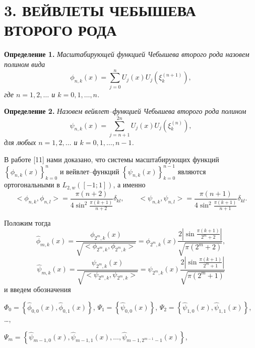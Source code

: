 \documentclass[12pt]{book}
\begin{document}
\section*{3. ВЕЙВЛЕТЫ ЧЕБЫШЕВА ВТОРОГО РОДА}

\noindent\textbf{Определение 1. }\textit{
Масштабирующей функцией Чебышева второго рода назовем полином вида
\begin{equation*}
\label{scaling}
\phi_{n,k}(x) = \sum\limits_{j=0}^{n}U_{j}(x)U_{j}(\xi_{k}^{(n+1)}),
\end{equation*}
где
$n=1,2,\ldots$ и $k=0,1,\ldots,n$.
}


\noindent\textbf{Определение 2. }\textit{
Назовем вейвлет--функцией Чебышева второго рода полином
\begin{equation*}
\label{sms1wavelet}
\psi_{n,k}(x) = \sum\limits_{j=n+1}^{2n}U_{j}(x)U_{j}(\xi_{k}^{(n)}),
\end{equation*}
для любых
$n=1,2,\ldots$ и $k=0,1,\ldots,n-1$.
}



В работе [11]
нами доказано, что системы масштабирующих функций  $\left\{ \phi_{n,k}(x)\right\}_{k=0}^{n}$ и
вейвлет--функций $\left\{ \psi_{n,k}(x)\right\}_{k=0}^{n-1}$ являются ортогональными в $L_{2, w}([-1; 1])$, а именно
\begin{equation*}
<\phi_{n,k}, \phi_{n,l}> =
\frac{\pi(n+2)}{4\sin^2{\frac{\pi(k+1)}{n+2}}} \delta_{kl}, \qquad <\psi_{n,k}, \psi_{n,l}> =
\frac{\pi(n+1)}{4\sin^2{\frac{\pi(k+1)}{n+1}}} \delta_{kl}.
\end{equation*}


Положим тогда
\begin{equation*}
\hat{\phi}_{m,k}(x) = \frac{\phi_{2^m,k}(x)}{\sqrt{<\phi_{2^m,k}, \phi_{2^m,k}>}} = \phi_{2^m,k}(x)   \frac{2\left|\sin{\frac{\pi(k+1)}{2^m+2}}\right|}{\sqrt{\pi(2^m+2)}},
\end{equation*}
\begin{equation*}
\hat{\psi}_{m,k}(x) = \frac{\psi_{2^m,k}(x)}{\sqrt{<\psi_{2^m,k}, \psi_{2^m,k}>}} = \psi_{2^m,k}(x)   \frac{2\left| \sin{\frac{\pi(k+1)}{2^m+1}}\right|}{\sqrt{\pi(2^m+1)}}
\end{equation*}
и введем обозначения

$\Phi_{0} = \left\{\hat{\phi}_{0,0}(x), \hat{\phi}_{0,1}(x) \right\}$,
$\Psi_{1} =  \left\{\hat{\psi}_{0,0}(x) \right\}$,
$\Psi_{2} =  \left\{\hat{\psi}_{1,0}(x), \hat{\psi}_{1,1}(x) \right\}$, \ldots ,

$\Psi_{m} =  \left\{\hat{\psi}_{m-1,0}(x), \hat{\psi}_{m-1,1}(x), \ldots, \hat{\psi}_{m-1, 2^{m-1}-1}(x)  \right\}$,
\end{document}
